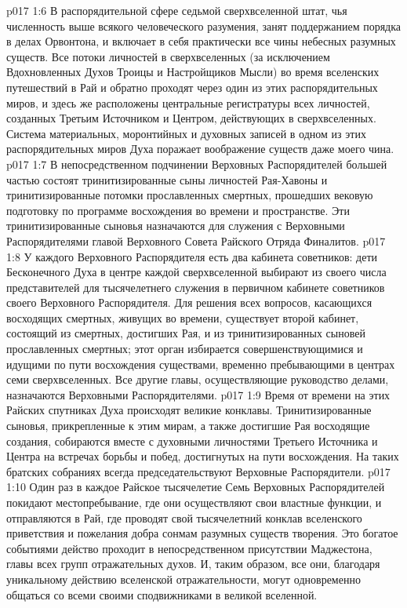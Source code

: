 \vs p017 1:6 В распорядительной сфере седьмой сверхвселенной штат, чья численность выше всякого человеческого разумения, занят поддержанием порядка в делах Орвонтона, и включает в себя практически все чины небесных разумных существ. Все потоки личностей в сверхвселенных (за исключением Вдохновленных Духов Троицы и Настройщиков Мысли) во время вселенских путешествий в Рай и обратно проходят через один из этих распорядительных миров, и здесь же расположены центральные регистратуры всех личностей, созданных Третьим Источником и Центром, действующих в сверхвселенных. Система материальных, моронтийных и духовных записей в одном из этих распорядительных миров Духа поражает воображение существ даже моего чина.
\vs p017 1:7 В непосредственном подчинении Верховных Распорядителей большей частью состоят тринитизированные сыны личностей Рая\hyp{}Хавоны и тринитизированные потомки прославленных смертных, прошедших вековую подготовку по программе восхождения во времени и пространстве. Эти тринитизированные сыновья назначаются для служения с Верховными Распорядителями главой Верховного Совета Райского Отряда Финалитов.
\vs p017 1:8 У каждого Верховного Распорядителя есть два кабинета советников: дети Бесконечного Духа в центре каждой сверхвселенной выбирают из своего числа представителей для тысячелетнего служения в первичном кабинете советников своего Верховного Распорядителя. Для решения всех вопросов, касающихся восходящих смертных, живущих во времени, существует второй кабинет, состоящий из смертных, достигших Рая, и из тринитизированных сыновей прославленных смертных; этот орган избирается совершенствующимися и идущими по пути восхождения существами, временно пребывающими в центрах семи сверхвселенных. Все другие главы, осуществляющие руководство делами, назначаются Верховными Распорядителями.
\vs p017 1:9 \pc Время от времени на этих Райских спутниках Духа происходят великие конклавы. Тринитизированные сыновья, прикрепленные к этим мирам, а также достигшие Рая восходящие создания, собираются вместе с духовными личностями Третьего Источника и Центра на встречах борьбы и побед, достигнутых на пути восхождения. На таких братских собраниях всегда председательствуют Верховные Распорядители.
\vs p017 1:10 Один раз в каждое Райское тысячелетие Семь Верховных Распорядителей покидают местопребывание, где они осуществляют свои властные функции, и отправляются в Рай, где проводят свой тысячелетний конклав вселенского приветствия и пожелания добра сонмам разумных существ творения. Это богатое событиями действо проходит в непосредственном присутствии Маджестона, главы всех групп отражательных духов. И, таким образом, все они, благодаря уникальному действию вселенской отражательности, могут одновременно общаться со всеми своими сподвижниками в великой вселенной.
